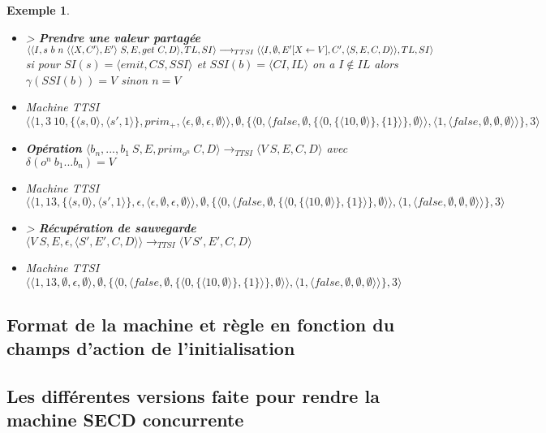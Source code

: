 \documentclass[10pt,a4paper]{report}
\newtheorem{ex}{Exemple}
\begin{document}
\begin{ex}
\begin{itemize}
			\item[] > \textbf{Prendre une valeur partagée} $\langle\langle I,s~b~n~\langle\langle X,C'\rangle,E'\rangle~S,E,get~C,D\rangle,TL,SI\rangle 
			\longrightarrow_{TTSI} 
			\\\langle\langle I,\emptyset,E'[X \leftarrow V],C',\langle S,E,C,D\rangle\rangle,TL,SI\rangle$
			\\ si pour $SI(s) = \langle emit,CS,SSI\rangle$ et $SSI(b) = \langle CI,IL\rangle$ on a $I \notin IL$ alors $\gamma(SSI(b)) = V$ sinon $n = V$
			\item[] Machine TTSI $\langle\langle 1,3~10,\{\langle s,0\rangle,\langle s',1\rangle\},prim_{+} ,\langle\epsilon,\emptyset,\epsilon,\emptyset\rangle\rangle,\emptyset,\{\langle 0,\langle false,\emptyset,\{\langle 0,\{\langle 10,\emptyset\rangle\},\{1\}\rangle\},\emptyset\rangle\rangle,\langle 1,\langle false,\emptyset,\emptyset,\emptyset\rangle\rangle\},3\rangle$ 
			\item[] \textbf{Opération} $\langle b_{n},...,b_{1}~S,E,prim_{o^{n}}~C,D\rangle
			\longrightarrow_{TTSI} 
			\langle V~S,E,C,D\rangle$ avec $\delta(o^{n}~b_{1}...b_{n}) = V$
			\item[] Machine TTSI $\langle\langle 1,13,\{\langle s,0\rangle,\langle s',1\rangle\},\epsilon ,\langle\epsilon,\emptyset,\epsilon,\emptyset\rangle\rangle,\emptyset,\{\langle 0,\langle false,\emptyset,\{\langle 0,\{\langle 10,\emptyset\rangle\},\{1\}\rangle\},\emptyset\rangle\rangle,\langle 1,\langle false,\emptyset,\emptyset,\emptyset\rangle\rangle\},3\rangle$ 
			\item[] > \textbf{Récupération de sauvegarde} $\langle V~S,E,\epsilon,\langle S',E',C,D\rangle\rangle
			\longrightarrow_{TTSI} 
			\langle V~S',E',C,D\rangle$
			\item[] Machine TTSI $\langle\langle 1,13,\emptyset,\epsilon,\emptyset\rangle,\emptyset,\{\langle 0,\langle false,\emptyset,\{\langle 0,\{\langle 10,\emptyset\rangle\},\{1\}\rangle\},\emptyset\rangle\rangle,\langle 1,\langle false,\emptyset,\emptyset,\emptyset\rangle\rangle\},3\rangle$ 
		\end{itemize}
	\end{ex}
	\newpage
	
	\subsection*{Format de la machine et règle en fonction du champs d'action de l'initialisation}
	\newpage
	
	\subsection*{Les différentes versions faite pour rendre la machine SECD concurrente}
	
\end{document}
